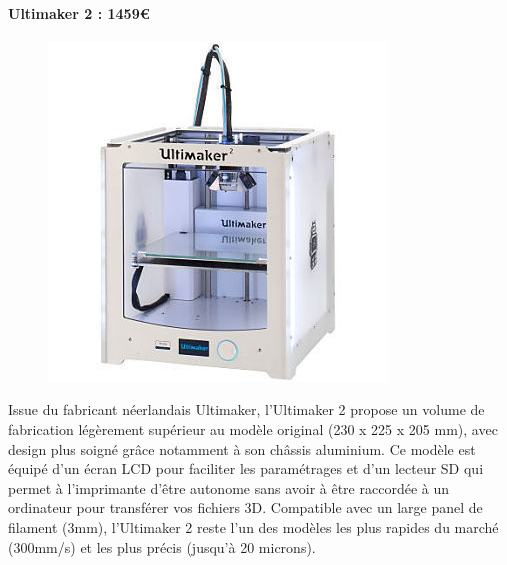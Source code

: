 \documentclass{article}
\begin{document}
\paragraph{Ultimaker 2 : 1459\euro{}} \hfill \break
\begin{figure}[h!]
\centering
\includegraphics[scale=0.4]{./images/ultimaker-2.png}
\end{figure}\hfill \break
Issue du fabricant néerlandais Ultimaker, l'Ultimaker 2 propose un volume de fabrication légèrement supérieur au modèle original (230 x 225 x 205 mm), avec design plus soigné grâce notamment à son châssis aluminium. Ce modèle est équipé d'un écran LCD pour faciliter les paramétrages et d'un lecteur SD qui permet à l'imprimante d'être autonome sans avoir à être raccordée à un ordinateur pour transférer vos fichiers 3D. Compatible avec un large panel de filament (3mm), l'Ultimaker 2 reste l'un des modèles les plus rapides du marché (300mm/s) et les plus précis (jusqu'à 20 microns).
\newpage
\end{document}
